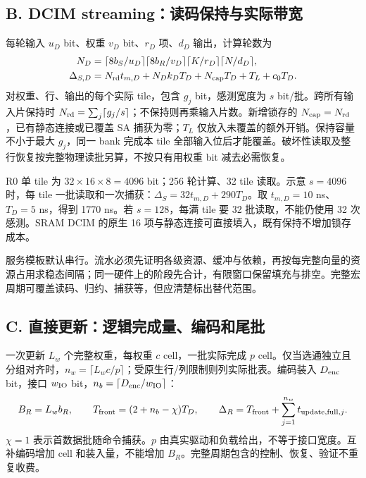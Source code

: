 \subsection{B. DCIM streaming：读码保持与实际带宽}

每轮输入 $u_D$ bit、权重 $v_D$ bit、$r_D$ 项、$d_D$ 输出，计算轮数为
\begin{equation}
\begin{aligned}
N_D&=\lceil8b_S/u_D\rceil\lceil8b_R/v_D\rceil\lceil K/r_D\rceil\lceil N/d_D\rceil,\\
\Delta_{S,D}&=N_{\rm rd}t_{m,D}+N_Dk_DT_D+N_{\rm cap}T_D+T_L+c_0T_D.
\end{aligned}
\label{eq:dcim}
\end{equation}
对权重、行、输出的每个实际 tile，包含 $g_j$ bit，感测宽度为 $s$ bit/批。跨所有输入片保持时 $N_{\rm rd}=\sum_j\lceil g_j/s\rceil$；不保持则再乘输入片数。新增锁存的 $N_{\rm cap}=N_{\rm rd}$，已有静态连接或已覆盖 SA 捕获为零；$T_L$ 仅放入未覆盖的额外开销。保持容量不小于最大 $g_j$，同一 bank 完成本 tile 全部输入位后才能覆盖。破坏性读取及整行恢复按完整物理读批另算，不按只有用权重 bit 减去必需恢复。

R0 单 tile 为 $32\times16\times8=4096$ bit；256 轮计算、32 tile 读取。示意 $s=4096$ 时，每 tile 一批读取和一次捕获：$\Delta_S=32t_{m,D}+290T_D$。取 $t_{m,D}=10$ ns、$T_D=5$ ns，得到 1770 ns。若 $s=128$，每满 tile 要 32 批读取，不能仍使用 32 次感测。SRAM DCIM 的原生 16 项与静态连接可直接填入，既有保持不增加锁存成本。

服务模板默认串行。流水必须先证明各级资源、缓冲与依赖，再按每完整向量的资源占用求稳态间隔；同一硬件上的阶段先合计，有限窗口保留填充与排空。完整宏周期可覆盖读码、归约、捕获等，但应清楚标出替代范围。

\subsection{C. 直接更新：逻辑完成量、编码和尾批}

一次更新 $L_w$ 个完整权重，每权重 $c$ cell，一批实际完成 $p$ cell。仅当选通独立且分组对齐时，$n_w=\lceil L_wc/p\rceil$；受原生行/列限制则列实际批表。编码装入 $D_{\rm enc}$ bit，接口 $w_{\rm IO}$ bit，$n_b=\lceil D_{\rm enc}/w_{\rm IO}\rceil$：
\begin{equation}
B_R=L_wb_R,\qquad T_{\rm front}=(2+n_b-\chi)T_D,\qquad
\Delta_R=T_{\rm front}+\sum_{j=1}^{n_w}t_{{\rm update,full},j}.
\label{eq:direct}
\end{equation}
$\chi=1$ 表示首数据批随命令捕获。$p$ 由真实驱动和负载给出，不等于接口宽度。互补编码增加 cell 和装入量，不能增加 $B_R$。完整周期包含的控制、恢复、验证不重复收费。

